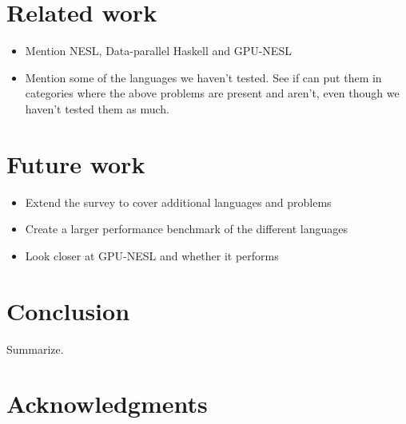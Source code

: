 \documentclass{llncs2e/llncs}
\begin{document}
\section{Related work}
\begin{itemize}
\item Mention NESL, Data-parallel Haskell and GPU-NESL
\item Mention some of the languages we haven't tested. See if can put
  them in categories where the above problems are present and aren't,
  even though we haven't tested them as much.
\end{itemize}

\section{Future work}
\begin{itemize}
\item Extend the survey to cover additional languages and problems
\item Create a larger performance benchmark of the different languages
\item Look closer at GPU-NESL and whether it performs
\end{itemize}

\section{Conclusion}
Summarize.

\section{Acknowledgments}

 

\end{document}
